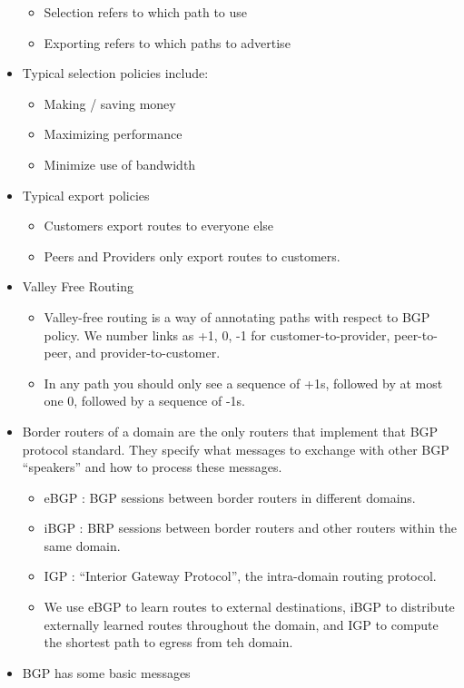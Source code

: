 \begin{itemize}
  \begin{itemize}
  \tightlist
  \item
    Selection refers to which path to use
  \item
    Exporting refers to which paths to advertise
  \end{itemize}
\item
  Typical selection policies include:

  \begin{itemize}
  \tightlist
  \item
    Making / saving money
  \item
    Maximizing performance
  \item
    Minimize use of bandwidth
  \end{itemize}
\item
  Typical export policies

  \begin{itemize}
  \tightlist
  \item
    Customers export routes to everyone else
  \item
    Peers and Providers only export routes to customers.
  \end{itemize}
\item
  Valley Free Routing

  \begin{itemize}
  \tightlist
  \item
    Valley-free routing is a way of annotating paths with respect to BGP
    policy. We number links as +1, 0, -1 for customer-to-provider,
    peer-to-peer, and provider-to-customer.
  \item
    In any path you should only see a sequence of +1s, followed by at
    most one 0, followed by a sequence of -1s.
  \end{itemize}
\item
  Border routers of a domain are the only routers that implement that
  BGP protocol standard. They specify what messages to exchange with
  other BGP ``speakers'' and how to process these messages.

  \begin{itemize}
  \tightlist
  \item
    eBGP : BGP sessions between border routers in different domains.
  \item
    iBGP : BRP sessions between border routers and other routers within
    the same domain.
  \item
    IGP : ``Interior Gateway Protocol'', the intra-domain routing
    protocol.
  \item
    We use eBGP to learn routes to external destinations, iBGP to
    distribute externally learned routes throughout the domain, and IGP
    to compute the shortest path to egress from teh domain.
  \end{itemize}
\item
  BGP has some basic messages


\end{itemize}

